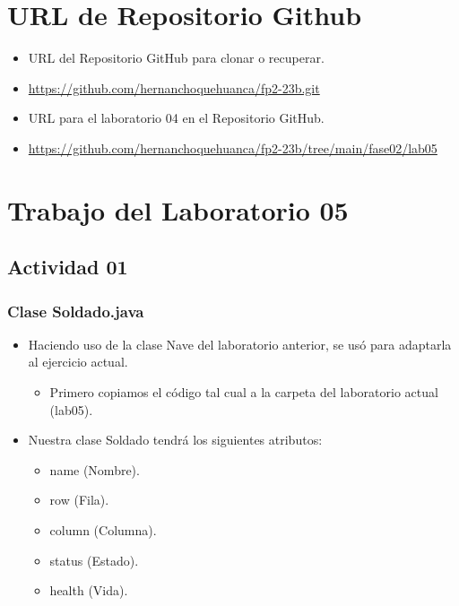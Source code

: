 \documentclass{article}
\begin{document}
	\section{URL de Repositorio Github}
	\begin{itemize}
		\item URL del Repositorio GitHub para clonar o recuperar.
        \item \url{https://github.com/hernanchoquehuanca/fp2-23b.git}
		\item URL para el laboratorio 04 en el Repositorio GitHub.
		\item \url{https://github.com/hernanchoquehuanca/fp2-23b/tree/main/fase02/lab05}
	\end{itemize}
	
	\section{Trabajo del Laboratorio 05}
        
        


    \subsection{Actividad 01}
    
        \subsubsection{Clase Soldado.java}
        \begin{itemize}	
            \item Haciendo uso de la clase Nave del laboratorio anterior, se usó para adaptarla al ejercicio actual.
            \begin{itemize}
                \item Primero copiamos el código tal cual a la carpeta del laboratorio actual (lab05).
            \end{itemize}
            \item Nuestra clase Soldado tendrá los siguientes atributos:
            \begin{itemize}
                \item name (Nombre).
                \item row (Fila).
                \item column (Columna).
                \item status (Estado).
                \item health (Vida).
            \end{itemize}
            
        \end{itemize}
        
\end{document}
